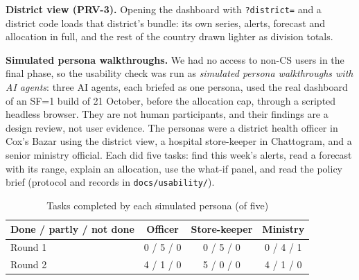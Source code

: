 \textbf{District view (PRV-3).} Opening the dashboard with \texttt{?district=} and a district code loads that
district's bundle: its own series, alerts, forecast and allocation in full, and the rest of the country drawn
lighter as division totals.

\textbf{Simulated persona walkthroughs.} We had no access to non-CS users in the final phase, so the
usability check was run as \emph{simulated persona walkthroughs with AI agents}: three AI agents, each briefed
as one persona, used the real dashboard of an SF=1 build of 21 October, before the allocation cap, through a scripted headless browser. They are
not human participants, and their findings are a design review, not user evidence. The personas were a
district health officer in Cox's Bazar using the district view, a hospital store-keeper in Chattogram, and a
senior ministry official. Each did five tasks: find this week's alerts, read a forecast with its range, explain
an allocation, use the what-if panel, and read the policy brief (protocol and records in
\texttt{docs/usability/}).

\begin{table}[htbp]
\caption{Tasks completed by each simulated persona (of five)}
\label{tab:usability}
\centering\small
\setlength{\tabcolsep}{4pt}
\begin{tabular}{@{}lccc@{}}
\toprule
Done / partly / not done & Officer & Store-keeper & Ministry \\
\midrule
Round 1 & 0 / 5 / 0 & 0 / 5 / 0 & 0 / 4 / 1 \\
Round 2 & 4 / 1 / 0 & 5 / 0 / 0 & 4 / 1 / 0 \\
\bottomrule
\end{tabular}
\end{table}

